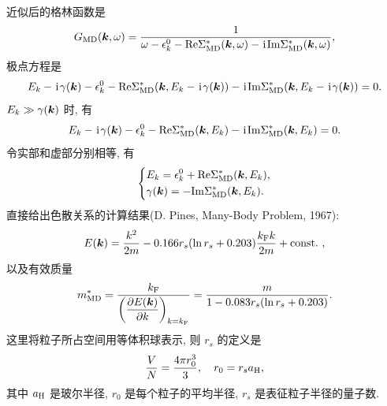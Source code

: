 近似后的格林函数是 
\begin{equation}
    G_{\mathrm{MD}}(\boldsymbol{k},\omega)=\frac{1}{\omega-\epsilon_k^0-\mathrm{Re}\Sigma_{\mathrm{MD}}^*(\boldsymbol{k},\omega)-\hspace{0.1em}\mathrm{i}\hspace{0.1em}\mathrm{Im}\Sigma_{\mathrm{MD}}^*(\boldsymbol{k},\omega)},
\end{equation}
极点方程是 
\begin{equation}
    E_k-\hspace{0.1em}\mathrm{i}\hspace{0.1em}\gamma(\boldsymbol{k})-\epsilon_k^0-\mathrm{Re}\Sigma_{\mathrm{MD}}^*(\boldsymbol{k},E_k-\hspace{0.1em}\mathrm{i}\hspace{0.1em}\gamma(\boldsymbol{k}))-\hspace{0.1em}\mathrm{i}\hspace{0.1em}\mathrm{Im}\Sigma_{\mathrm{MD}}^*(\boldsymbol{k},E_k-\hspace{0.1em}\mathrm{i}\hspace{0.1em}\gamma(\boldsymbol{k}))=0.
\end{equation}
$E_k\gg \gamma(\boldsymbol{k})$ 时, 有 
\begin{equation}
    E_k-\hspace{0.1em}\mathrm{i}\hspace{0.1em}\gamma(\boldsymbol{k})-\epsilon_k^0-\mathrm{Re}\Sigma_{\mathrm{MD}}^*(\boldsymbol{k},E_k)-\hspace{0.1em}\mathrm{i}\hspace{0.1em}\mathrm{Im}\Sigma_{\mathrm{MD}}^*(\boldsymbol{k},E_k)=0.
\end{equation}
令实部和虚部分别相等, 有 
\begin{equation}
    \left\{
        \begin{aligned}
            &E_k=\epsilon_k^0+\mathrm{Re}\Sigma_{\mathrm{MD}}^*(\boldsymbol{k},E_k),\\
            &\gamma(\boldsymbol{k})=-\mathrm{Im}\Sigma_{\mathrm{MD}}^*(\boldsymbol{k},E_k).
        \end{aligned}
    \right.
\end{equation}
直接给出色散关系的计算结果(D. Pines, Many-Body Problem, 1967):
\begin{equation}
    E(\boldsymbol{k})=\frac{k^2}{2m}-0.166r_s(\ln r_s+0.203)\frac{k_{\mathrm{F}}k}{2m}+\text{const.}\ ,
\end{equation}
以及有效质量 
\begin{equation}
    m_{\mathrm{MD}}^*=\frac{k_{\mathrm{F}}}{\displaystyle \left( \frac{\partial E(\boldsymbol{k})}{\partial k} \right)_{k=k_{\mathrm{F}}}}=\frac{m}{1-0.083 r_s(\ln r_s+0.203)}.
\end{equation}
这里将粒子所占空间用等体积球表示, 则 $r_s$ 的定义是 
\begin{equation}
    \frac{V}{N}=\frac{4\pi r_0^3}{3},\quad r_0=r_s a_{\mathrm{H}},
\end{equation}
其中 $a_{\mathrm{H}}$ 是玻尔半径, $r_0$ 是每个粒子的平均半径, $r_s$ 是表征粒子半径的量子数.

